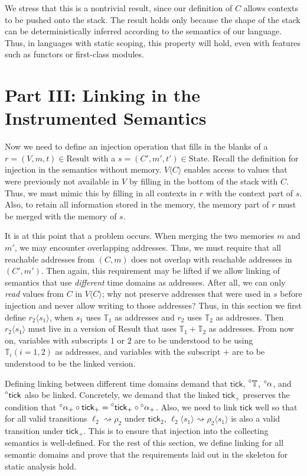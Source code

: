 \documentclass{article}
\theoremstyle{definition}
\newcommand*{\A}[1]{\prescript{\circ}{}{#1}}
\newcommand*{\Time}{\mathbb{T}}
\newcommand*{\mem}{m}
\newcommand*{\State}{\text{State}}
\newcommand*{\Result}{\text{Result}}
\newcommand*{\semarrow}{\rightsquigarrow}
\newcommand*{\tick}{\mathsf{tick}}
\newcommand*{\inject}[2]{{#2}\langle{#1}\rangle}
\begin{document}
We stress that this is a nontrivial result, since our definition of $C$ allows contexts to be pushed onto the stack.
The result holds only because the shape of the stack can be deterministically inferred according to the semantics of our language.
Thus, in languages with static scoping, this property will hold, even with features such as functors or first-class modules.

\section{Part III: Linking in the Instrumented Semantics}
Now we need to define an injection operation that fills in the blanks of a $r=(V,\mem,t)\in\Result$ with a $s=(C',\mem',t')\in\State$.
Recall the definition for injection in the semantics without memory.
$\inject{C}{V}$ enables access to values that were previously not available in $V$ by filling in the bottom of the stack with $C$.
Thus, we must mimic this by filling in all contexts in $r$ with the context part of $s$.
Also, to retain all information stored in the memory, the memory part of $r$ must be merged with the memory of $s$.

It is at this point that a problem occurs.
When merging the two memories $\mem$ and $\mem'$, we may encounter overlapping addresses.
Thus, we must require that all reachable addresses from $(C,\mem)$ does not overlap with reachable addresses in $(C',\mem')$.
Then again, this requirement may be lifted if we allow linking of semantics that use \emph{different} time domains as addresses.
After all, we can only \emph{read} values from $C$ in $\inject{C}{V}$; why not preserve addresses that were used in $s$ before injection and never allow writing to those addresses?
Thus, in this section we first define $\inject{s_1}{r_2}$, when $s_1$ uses $\Time_1$ as addresses and $r_2$ uses $\Time_2$ as addresses.
Then $\inject{s_1}{r_2}$ must live in a version of $\Result$ that uses $\Time_1+\Time_2$ as addresses.
From now on, variables with subscripts $1$ or $2$ are to be understood to be using $\Time_i(i=1,2)$ as addresses, and variables with the subscript $+$ are to be understood to be the linked version.

Defining linking between different time domains demand that $\tick$, $\A\Time$, $\A\alpha$, and $\A\tick$ also be linked.
Concretely, we demand that the linked $\tick_+$ preserves the condition that $\A\alpha_+\circ\tick_+=\A\tick_+\circ\A\alpha_+$.
Also, we need to link $\tick$ well so that for all valid transitions $\ell_2\semarrow\rho_2$ under $\tick_2$, $\inject{s_1}{\ell_2}\semarrow\inject{s_1}{\rho_2}$ is also a valid transition under $\tick_+$.
This is to ensure that injection into the collecting semantics is well-defined.
For the rest of this section, we define linking for all semantic domains and prove that the requirements laid out in the skeleton for static analysis hold.
\end{document}
